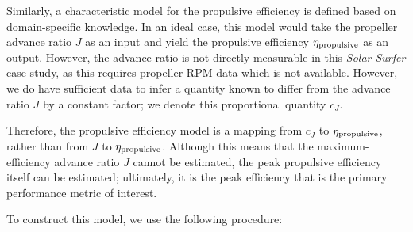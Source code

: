 \documentclass[conf]{new-aiaa}
\begin{document}
    Similarly, a characteristic model for the propulsive efficiency is defined based on domain-specific knowledge. In an ideal case, this model would take the propeller advance ratio $J$ as an input and yield the propulsive efficiency $\eta_{\rm propulsive}$ as an output. However, the advance ratio is not directly measurable in this \emph{Solar Surfer} case study, as this requires propeller RPM data which is not available. However, we do have sufficient data to infer a quantity known to differ from the advance ratio $J$ by a constant factor; we denote this proportional quantity $c_J$.

    Therefore, the propulsive efficiency model is a mapping from $c_J$ to $\eta_{\rm propulsive}$, rather than from $J$ to $\eta_{\rm propulsive}$. Although this means that the maximum-efficiency advance ratio $J$ cannot be estimated, the peak propulsive efficiency itself can be estimated; ultimately, it is the peak efficiency that is the primary performance metric of interest.

    To construct this model, we use the following procedure:
\end{document}
